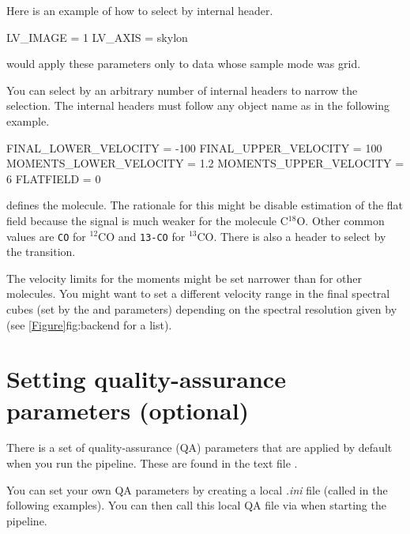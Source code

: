 \documentclass[11pt,oneside,chapters]{starlink}
\begin{document}
Here is an example of how to select by internal header.

\vspace{0.2cm}
\begin{terminalv}
[REDUCE_SCIENCE_NARROWLINE#SAMPLE_MODE=GRID]
LV_IMAGE = 1
LV_AXIS = skylon
\end{terminalv}

would apply these parameters only to data whose sample mode was grid.

You can select by an arbitrary number of internal headers to
narrow the selection.  The internal headers must follow any object name
as in the following example.

\vspace{0.2cm}
\begin{terminalv}
[REDUCE_SCIENCE_NARROWLINE:HH21#SPECIES=C-18-O#BANDWIDTH_MODE=250MHzx4096]
FINAL_LOWER_VELOCITY = -100
FINAL_UPPER_VELOCITY = 100
MOMENTS_LOWER_VELOCITY = 1.2
MOMENTS_UPPER_VELOCITY = 6
FLATFIELD = 0
\end{terminalv}

 defines the molecule.  The rationale for this might be
disable estimation of the flat field because the signal is much weaker
for the molecule C$^{18}$O.  Other common values are \texttt{CO} for
$^{12}$CO and \texttt{13-CO} for $^{13}$CO.  There is also a
 header to select by the transition.

The velocity limits for the moments might be set narrower than for
other molecules.  You might want to set a different velocity range in
the final spectral cubes (set by the  and
 parameters) depending on the spectral
resolution given by  (see
\cref{Figure}{fig:backend}{} for a list).


\section{Setting quality-assurance parameters (optional)}
\label{sec:qa}

There is a set of quality-assurance (QA) parameters that are applied
by default when you run the pipeline. These are found in the text file
.

You can set your own QA parameters by creating a local \textit{.ini}
file (called  in the following examples). You can then call
this local QA file via  when starting
the pipeline.
\end{document}
